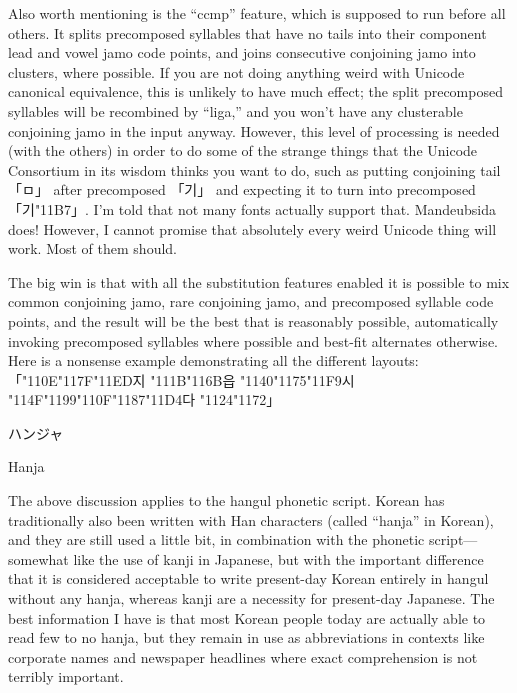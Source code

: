 \documentclass[14pt]{extarticle}
\newcommand{\blsubsection}[2]{%
\kaku\large#1\qquad\phantomsection%
\addcontentsline{toc}{subsection}{#1 #2}%
#2\par\addpenalty{-300}\normalsize}
\begin{document}
Also worth mentioning is the ``ccmp'' feature, which is supposed to run
before all others.  It splits precomposed syllables that have no tails into
their component lead and vowel jamo code points, and joins consecutive
conjoining jamo into clusters, where possible.  If you are not doing
anything weird with Unicode canonical equivalence, this is unlikely to have
much effect; the split precomposed syllables will be recombined by ``liga,''
and you won't have any clusterable conjoining jamo in the input anyway. 
However, this level of processing is needed (with the others) in order to do
some of the strange things that the Unicode Consortium in its wisdom
thinks you want to do, such as putting conjoining tail {\dodum 「ㅁ」} after
precomposed {\dodum 「기」} and expecting it to turn into precomposed
{\dodum 「기\char"11B7」}.  I'm told that not many fonts actually support
that.  Mandeubsida does!  However, I cannot promise that absolutely every
weird Unicode thing will work.  Most of them should.

The big win is that with all the substitution
features enabled it is possible to mix common conjoining jamo,
rare conjoining jamo, and precomposed syllable code points, and the result
will be the best that is reasonably possible, automatically invoking
precomposed syllables where possible and best-fit alternates otherwise. 
Here is a nonsense example demonstrating all the different layouts:
{\dodum%
「\char"110E\char"117F\char"11ED지%
\char"111B\char"116B읍%
\char"1140\char"1175\char"11F9시%
\char"114F\char"1199\char"110F\char"1187\char"11D4다%
\char"1124\char"1172」}


\blsubsection{ハンジャ}{Hanja}

The above discussion applies to the hangul phonetic script.  Korean has
traditionally also been written with Han characters (called ``hanja'' in
Korean), and they are still used a little bit, in combination with the
phonetic script---somewhat like the use of kanji in Japanese, but with the
important difference that it is considered acceptable to write present-day
Korean entirely in hangul without any hanja, whereas kanji are a necessity
for present-day Japanese.  The best information I have is that most Korean
people today are actually able to read few to no hanja, but they remain in
use as abbreviations in contexts like corporate names and newspaper
headlines where exact comprehension is not terribly important.
\end{document}
